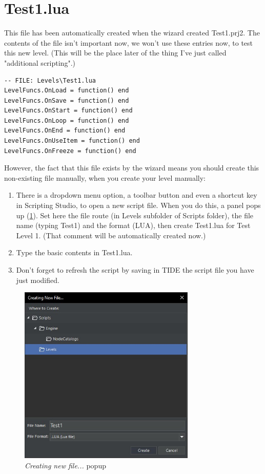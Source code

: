 \section{Test1.lua}

This file has been automatically created when the wizard created Test1.prj2.
The contents of the file isn't important now, we won't use these entries now, to test this new level. (This will be the place later of the thing I've just called "additional scripting".)

\begin{lstlisting}[style=lua]
-- FILE: Levels\Test1.lua
LevelFuncs.OnLoad = function() end
LevelFuncs.OnSave = function() end
LevelFuncs.OnStart = function() end
LevelFuncs.OnLoop = function() end
LevelFuncs.OnEnd = function() end
LevelFuncs.OnUseItem = function() end
LevelFuncs.OnFreeze = function() end
\end{lstlisting}

However, the fact that this file exists by the wizard means you should create this non-existing file manually, when you create your level manually:
\begin{enumerate}
    \item There is a dropdown menu option, a toolbar button and even a shortcut key in Scripting Studio, to open a new script file. 
When you do this, a panel pops up (\ref{fig:TIDEnewfile}). Set here the file route (in Levels subfolder of Scripts folder), the file name (typing Test1) and the format (LUA), then create Test1.lua for Test Level 1. (That  comment will be automatically created now.)
    \item Type the basic contents in Test1.lua.
    \item Don't forget to refresh the script by saving in TIDE the script file you have just modified.
\end{enumerate}

\begin{figure}
    \centering
     \includegraphics[width=0.75\textwidth]{screenshots/29.jpg}
     \caption{\emph{Creating new file...} popup}
     \label{fig:TIDEnewfile}
\end{figure}

